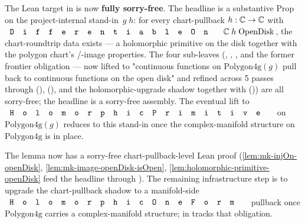\begin{proofsketch}
The Lean target in
 is now
\textbf{fully sorry-free}. The headline
 is a substantive Prop on the
project-internal stand-in
\,\(g\;h\): for every chart-pullback
\(h:\mathbb{C}\to\mathbb{C}\) with \(\code{DifferentiableOn}\;\C\;h\;\mathrm{OpenDisk}\),
the chart-roundtrip data exists --- a holomorphic primitive on the
disk together with the polygon chart's
/-image properties. The four sub-leaves
(,
,
, and the former frontier
obligation  --- now
lifted to "continuous functions on \(\mathrm{Polygon4g}(g)\) pull
back to continuous functions on the open disk" and refined across
5 passes through 
(),
(), and the holomorphic-upgrade shadow
together with 
()) are all sorry-free; the
headline is a sorry-free assembly. The eventual lift to
\(\code{HolomorphicPrimitive}\) on \(\mathrm{Polygon4g}(g)\) reduces
to this stand-in once the complex-manifold structure on
\(\mathrm{Polygon4g}\) is in place.
\end{proofsketch}

\begin{formalizationnote}
The lemma now has a sorry-free chart-pullback-level Lean proof
(\ref{lem:mk-injOn-openDisk}, \ref{lem:mk-image-openDisk-isOpen},
\ref{lem:holomorphic-primitive-openDisk} feed the headline through
). The remaining infrastructure step
is to upgrade the chart-pullback shadow to a manifold-side
\(\code{HolomorphicOneForm}\) pullback once
\(\mathrm{Polygon4g}\) carries a complex-manifold structure;
 in
 tracks that obligation.
\end{formalizationnote}
